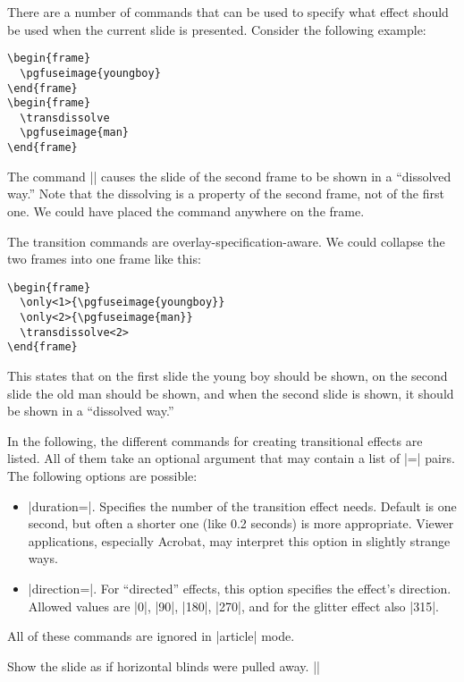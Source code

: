 There are a number of commands that can be used to specify what effect should be used when the current slide is presented. Consider the following example:
\begin{verbatim}
\begin{frame}
  \pgfuseimage{youngboy}
\end{frame}
\begin{frame}
  \transdissolve
  \pgfuseimage{man}
\end{frame}
\end{verbatim}
The command |\transdissolve| causes the slide of the second frame to be shown in a ``dissolved way.'' Note that the dissolving is a property of the second frame, not of the first one. We could have placed the command anywhere on the frame.

The transition commands are overlay-specification-aware. We could collapse the two frames into one frame like this:
\begin{verbatim}
\begin{frame}
  \only<1>{\pgfuseimage{youngboy}}
  \only<2>{\pgfuseimage{man}}
  \transdissolve<2>
\end{frame}
\end{verbatim}
This states that on the first slide the young boy should be shown, on the second slide the old man should be shown, and when the second slide is shown, it should be shown in a ``dissolved way.''

In the following, the different commands for creating transitional effects are listed. All of them take an optional argument that may contain a list of |=| pairs. The following options are possible:
\begin{itemize}
\item
  |duration=|. Specifies the number of  the transition effect needs. Default is one second, but often a shorter one (like 0.2 seconds) is more appropriate. Viewer applications, especially Acrobat, may interpret this option in slightly strange ways.
\item
  |direction=|. For ``directed'' effects, this option specifies the effect's direction. Allowed values are |0|, |90|, |180|, |270|, and for the glitter effect also |315|.
\end{itemize}

\articlenote
All of these commands are ignored in |article| mode.

\begin{command}{\transblindshorizontal{}}
  Show the slide as if horizontal blinds were pulled away.
  \example|\transblindshorizontal|
\end{command}

